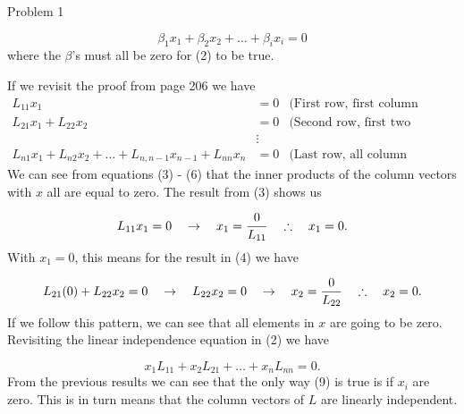 \begin{problem}{Problem 1}
\begin{highlight}[Solution]
        \begin{equation}
            \beta_{1}x_{1} + \beta_{2}x_{2} + \dots + \beta_{i}x_{i} = 0
        \end{equation}
        where the $\beta$'s must all be zero for (2) to be true.

        If we revisit the proof from page 206 we have
        \begin{align}
            L_{11}x_{1} & = 0 & \text{(First row, first column element)} \\
            L_{21}x_{1} + L_{22}x_{2} & = 0 & \text{(Second row, first two column elements)} \\
            & \vdots & \\
            L_{n1}x_{1} + L_{n2}x_{2} + \dots + L_{n,n-1}x_{n-1} + L_{nn}x_{n} & = 0 & \text{(Last row, all column elements.)}
        \end{align}
        We can see from equations (3) - (6) that the inner products of the column vectors with $x$ all are equal to zero. The result from (3) shows us

        \begin{equation}
            L_{11}x_{1} = 0 \hspace*{10pt} \rightarrow \hspace*{10pt} x_{1} = \frac{0}{L_{11}} \hspace*{10pt} \therefore \hspace*{10pt} x_{1} = 0.
        \end{equation}
        With $x_{1} = 0$, this means for the result in (4) we have 

        \begin{equation}
            L_{21}(0) + L_{22}x_{2} = 0 \hspace*{10pt} \rightarrow \hspace*{10pt} L_{22}x_{2} = 0 \hspace*{10pt} \rightarrow \hspace*{10pt} x_{2} = \frac{0}{L_{22}} \hspace*{10pt} \therefore \hspace*{10pt} x_{2} = 0.
        \end{equation}
        If we follow this pattern, we can see that all elements in $x$ are going to be zero. Revisiting the linear independence equation in (2) we have 

        \begin{equation}
            x_{1}L_{11} + x_{2}L_{21} + \dots + x_{n}L_{nn} = 0.
        \end{equation}
        From the previous results we can see that the only way (9) is true is if $x_{i}$ are zero. This is in turn means that the column vectors of $L$ are linearly independent.


\end{highlight}
\end{problem}

